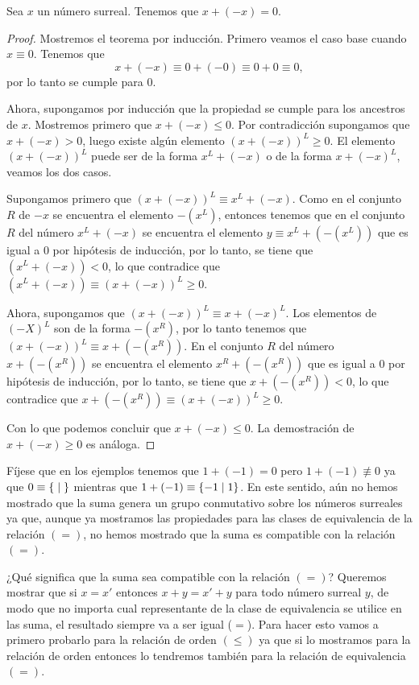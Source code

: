     \begin{theorem}
        Sea $x$ un n\'umero surreal. Tenemos que $x+(-x)=0$.
    \end{theorem}

    \begin{proof}
        Mostremos el teorema por inducci\'on. Primero veamos el caso base cuando $x\equiv 0$. Tenemos que
        \[
            x + (-x) \equiv 0 + (-0) \equiv 0+0 \equiv 0,
        \]
        por lo tanto se cumple para $0$.

        Ahora, supongamos por inducci\'on que la propiedad se cumple para los ancestros de $x$. Mostremos primero que $x + (-x) \le 0$. Por contradicci\'on supongamos que $x + (-x) > 0$, luego existe alg\'un elemento $(x + (-x))^L \ge 0$. El elemento $(x + (-x))^L$ puede ser de la forma $x^L + (-x)$ o de la forma $x + (-x)^L$, veamos los dos casos.

        Supongamos primero que $(x + (-x))^L \equiv x^L + (-x)$. Como en el conjunto $R$ de $-x$ se encuentra el elemento $-(x^L)$, entonces tenemos que en el conjunto $R$ del n\'umero $x^L + (-x)$ se encuentra el elemento $y \equiv x^L + (-(x^L))$ que es igual a $0$ por hip\'otesis de inducci\'on, por lo tanto, se tiene que $(x^L + (-x)) < 0$, lo que contradice que $(x^L + (-x))\equiv (x + (-x))^L \ge 0$.

        Ahora, supongamos que $(x + (-x))^L \equiv x + (-x)^L$. Los elementos de $(-X)^L$ son de la forma $-(x^R)$, por lo tanto tenemos que $(x + (-x))^L\equiv x + (-(x^R))$. En el conjunto $R$ del n\'umero $x + (-(x^R))$ se encuentra el elemento $x^R + (-(x^R))$ que es igual a $0$ por hip\'otesis de inducci\'on, por lo tanto, se tiene que $x + (-(x^R)) < 0$, lo que contradice que $x + (-(x^R))\equiv (x + (-x))^L \ge 0$.

        Con lo que podemos concluir que $x + (-x) \le 0$. La demostraci\'on de $x+(-x) \ge 0$ es an\'aloga.
    \end{proof}


    F\'ijese que en los ejemplos tenemos que $1+(-1) = 0$ pero $1+(-1)\not\equiv 0$ ya que $0\equiv \left\{\;\middle|\; \right\}$ mientras que $1+(-1)\equiv \left\{-1\;\middle|\; 1\right\}$. En este sentido, a\'un no hemos mostrado que la suma genera un grupo conmutativo sobre los n\'umeros surreales ya que, aunque ya mostramos las propiedades para las clases de equivalencia de la relaci\'on $(=)$, no hemos mostrado que la suma es compatible con la relaci\'on $(=)$.
    
    ¿Qué significa que la suma sea compatible con la relaci\'on $(=)$? Queremos mostrar que si $x = x'$ entonces $x+y = x'+y$ para todo n\'umero surreal $y$, de modo que no importa cual representante de la clase de equivalencia se utilice en las suma, el resultado siempre va a ser igual ($=$). Para hacer esto vamos a primero probarlo para la relaci\'on de orden $(\le)$ ya que si lo mostramos para la relaci\'on de orden entonces lo tendremos tambi\'en para la relaci\'on de equivalencia $(=)$.

